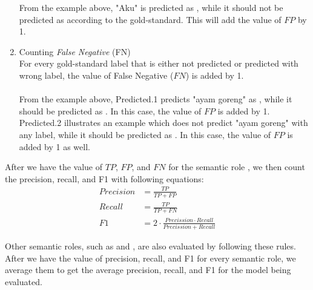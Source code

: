 \begin{enumerate}
	From the example above, "Aku" is predicted as \patient, while it should not be predicted as \patient according to the gold-standard. This will add the value of $FP$ by 1.
	\\
	
	\item Counting \textit{False Negative} (FN)\\
	For every gold-standard label that is either not predicted or predicted with wrong label, the value of False Negative ($FN$) is added by 1.
	\\
	
	\\
	
	From the example above, Predicted.1 predicts "ayam goreng" as \agent, while it should be predicted as \patient. In this case, the value of $FP$ is added by 1. Predicted.2 illustrates an example which does not predict "ayam goreng" with any label, while it should be predicted as \patient. In this case, the value of $FP$ is added by 1 as well.
	
\end{enumerate}

After we have the value of $TP$, $FP$, and $FN$ for the semantic role \patient, we then count the precision, recall, and F1 with following equations:
\begin{align}
Precision &= \frac{TP}{TP+FP}\\
Recall &= \frac{TP}{TP+FN}\\
F1 &= 2 \cdot \frac{Precission \cdot Recall}{Precission + Recall}
\end{align}

Other semantic roles, such as \agent and \beneficiary, are also evaluated by following these rules. After we have the value of precision, recall, and F1 for every semantic role, we average them to get the average precision, recall, and F1 for the model being evaluated.
	